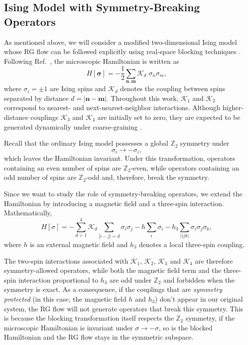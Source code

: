 \documentclass[a4paper, 11pt]{article}
\begin{document}
\subsection{Ising Model with Symmetry-Breaking Operators}

As mentioned above, we will consider a modified two-dimensional Ising model whose RG flow can be followed explicitly using real-space blocking techniques \cite{blocking}. Following Ref.~\cite{blocking}, the microscopic Hamiltonian is written as
\begin{equation*}
H[\bm{\sigma}]
=-\frac{1}{2}\sum_{\bm n,\bm m}\mathcal{K}_{d}\;\sigma_n \sigma_m,
\end{equation*}
where $\sigma_i=\pm1$ are Ising spins and $\mathcal{K}_{d}$ denotes the coupling between spins separated by distance $d=|\bm n-\bm m|$. Throughout this work, $\mathcal{K}_1$ and $\mathcal{K}_2$ correspond to nearest- and next-nearest-neighbor interactions. Although higher-distance couplings $\mathcal{K}_3$ and $\mathcal{K}_4$ are initially set to zero, they are expected to be generated dynamically under coarse-graining \cite{blocking}.

Recall that the ordinary Ising model possesses a global $\mathbb{Z}_2$ symmetry under
\begin{equation*}
\sigma_i \rightarrow -\sigma_i ,
\end{equation*}
which leaves the Hamiltonian invariant. Under this transformation, operators containing an even number of spins are $\mathbb{Z}_2$-even, while operators containing an odd number of spins are $\mathbb{Z}_2$-odd and, therefore, break the symmetry.

Since we want to study the role of symmetry-breaking operators, we extend the Hamiltonian by introducing a magnetic field and a three-spin interaction. Mathematically,
\begin{equation}
\label{eq:ising_hamiltonian}
H[\sigma]
=
-\sum_{d=1}^{4}\mathcal{K}_d \sum_{|i-j|=d}\sigma_i \sigma_j
-h\sum_i \sigma_i
-h_3\sum_{\langle ijk\rangle}\sigma_i\sigma_j\sigma_k ,
\end{equation}
where $h$ is an external magnetic field and $h_3$ denotes a local three-spin coupling.

The two-spin interactions associated with $\mathcal{K}_1$, $\mathcal{K}_2$, $\mathcal{K}_3$ and $\mathcal{K}_4$ are therefore symmetry-allowed operators, while both the magnetic field term and the three-spin interaction proportional to $h_3$ are odd under $\mathbb{Z}_2$ and forbidden when the symmetry is exact. As a consequence, if the couplings that are \emph{symmetry protected} (in this case, the magnetic field $h$ and $h_3$) don't appear in our original system, the RG flow will not generate operators that break this symmetry. This is because the blocking transformation itself respects the $\mathbb{Z}_2$ symmetry, if the microscopic Hamiltonian is invariant under $\sigma \to -\sigma$, so is the blocked Hamiltonian and the RG flow stays in the symmetric subspace.
\end{document}
